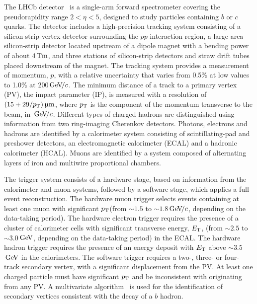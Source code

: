\documentclass[12pt,a4paper]{article}
\def\lhcb {\mbox{LHCb}\xspace}
\def\Pb      {\ensuremath{\mathrm{b}}\xspace}
\def\Pc      {\ensuremath{\mathrm{c}}\xspace}
\def\Pp      {\ensuremath{\mathrm{p}}\xspace}
\def\Pb      {\ensuremath{b}\xspace}
\def\Pc      {\ensuremath{c}\xspace}
\def\Pp      {\ensuremath{p}\xspace}
\def\cquark    {\ensuremath{\Pc}\xspace}
\def\bquark    {\ensuremath{\Pb}\xspace}
\def\proton      {\ensuremath{\Pp}\xspace}
\newcommand{\gev}{\ensuremath{\mathrm{\,Ge\kern -0.1em V}}\xspace}
\newcommand{\gevc}{\ensuremath{{\mathrm{\,Ge\kern -0.1em V\!/}c}}\xspace}
\def\mum  {\ensuremath{{\,\upmu\rm m}}\xspace}
\def\ptot       {\mbox{$p$}\xspace}
\def\pt         {\mbox{$p_{\rm T}$}\xspace}
\def\et         {\mbox{$E_{\rm T}$}\xspace}
\def\pp{\ensuremath{\proton\proton}\xspace}
\begin{document}
The \lhcb detector~\cite{Alves:2008zz,LHCb-DP-2014-002} is a single-arm forward
spectrometer covering the pseudorapidity range $2<\eta <5$, designed to study particles containing \bquark or \cquark quarks.
The detector includes a high-precision tracking system consisting of a silicon-strip vertex detector surrounding the \pp interaction region, a large-area silicon-strip detector located upstream of a dipole magnet with a bending power of about $4{\rm\,Tm}$, and three stations of silicon-strip detectors and straw
drift tubes placed downstream of the magnet.
The tracking system provides a measurement of momentum, \ptot, with a relative uncertainty that varies from 0.5\% at low values to 1.0\% at 200\gevc.
The minimum distance of a track to a primary vertex (PV), the impact parameter (IP), is measured with a resolution of $(15+29/\pt)\mum$, where \pt is the component of the momentum transverse to the beam, in \gevc.
Different types of charged hadrons are distinguished using information from two ring-imaging Cherenkov detectors.
Photons, electrons and hadrons are identified by a calorimeter system consisting of
scintillating-pad and preshower detectors, an electromagnetic calorimeter (ECAL) and a hadronic calorimeter (HCAL).
Muons are identified by a system composed of alternating layers of iron and multiwire
proportional chambers.

The trigger system consists of a hardware stage, based on information from the calorimeter and muon systems, followed by a software stage, which applies a full event reconstruction.
The hardware muon trigger selects events containing at least one muon with significant \pt (from $\sim1.5$ to $\sim1.8$\gevc, depending on the data-taking period).
The hardware electron trigger requires the presence of a cluster of calorimeter cells with significant transverse energy, \et, (from $\sim2.5$ to $\sim3.0$\gev, depending on the data-taking period) in the ECAL.
The hardware hadron trigger requires the presence of an energy deposit with \et above $\sim3.5$\gev in the calorimeters.
The software trigger requires a two-, three- or four-track secondary vertex, with a significant displacement from the PV.
At least one charged particle must have significant \pt and be inconsistent with originating from any PV.
A multivariate algorithm~\cite{BBDT} is used for the identification of secondary vertices consistent with the decay of a \bquark hadron.
\end{document}
